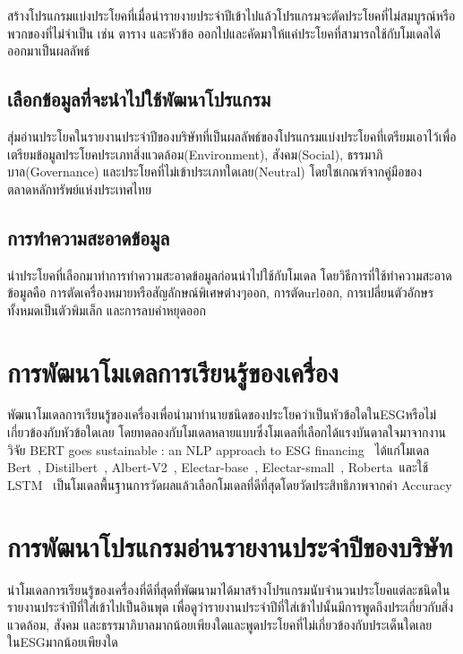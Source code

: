\enskip \enskip \enskip สร้างโปรแกรมแบ่งประโยคที่เมื่อนำรายงายประจำปีเข้าไปแล้วโปรแกรมจะตัดประโยคที่ไม่สมบูรณ์หรือพวกของที่ไม่จำเป็น 
เช่น ตาราง และหัวข้อ ออกไปและคัดมาให้แค่ประโยคที่สามารถใช้กับโมเดลได้ออกมาเป็นผลลัพธ์


\subsection{เลือกข้อมูลที่จะนำไปใช้พัฒนาโปรแกรม}

\enskip \enskip \enskip สุ่มอ่านประโยคในรายงานประจำปีของบริษัทที่เป็นผลลัพธ์ของโปรแกรมแบ่งประโยคที่เตรียมเอาไว้เพื่อเตรียมข้อมูลประโยคประเภทสิ่งแวดล้อม(Environment), 
สังคม(Social), ธรรมาภิบาล(Governance) และประโยคที่ไม่เข้าประเภทใดเลย(Neutral) โดยใชเกณฑ์จากคู่มือของตลาดหลักทรัพย์แห่งประเทศไทย ~\cite{sus}
  

\subsection{การทำความสะอาดข้อมูล}

\enskip \enskip \enskip นำประโยคที่เลือกมาทำการทำความสะอาดข้อมูลก่อนนำไปใช้กับโมเดล 
โดยวิธีการที่ใช้ทำความสะอาดข้อมูลคือ การตัดเครื่องหมายหรือสัญลักษณ์พิเศษต่างๆออก, การตัดurlออก, การเปลี่ยนตัวอักษรทั้งหมดเป็นตัวพิมเล็ก และการลบคำหยุดออก


\section{การพัฒนาโมเดลการเรียนรู้ของเครื่อง}

\enskip \enskip \enskip พัฒนาโมเดลการเรียนรู้ของเครื่องเพื่อนำมาทำนายชนิดของประโยคว่าเป็นหัวข้อใดในESGหรือไม่เกี่ยวข้องกับหัวข้อใดเลย 
โดยทดลองกับโมเดลหลายแบบซึ่งโมเดลที่เลือกได้แรงบันดาลใจมาจากงานวิจัย BERT goes sustainable : an NLP approach to ESG financing~\cite{torroni2021bert} ได้แก่โมเดล Bert~\cite{devlin2018bert}, Distilbert~\cite{sanh2019distilbert}, Albert-V2~\cite{lan2019albert}, Electar-base~\cite{clark2020electra}, Electar-small~\cite{clark2020electra}, Roberta~\cite{liu2019roberta}และใช้ LSTM~\cite{staudemeyer2019understanding} เป็นโมเดลพื้นฐานการวัดผลแล้วเลือกโมเดลที่ดีที่สุดโดยวัดประสิทธิภาพจากค่า Accuracy


\section{การพัฒนาโปรแกรมอ่านรายงานประจำปีของบริษัท}

\enskip \enskip \enskip นำโมเดลการเรียนรู้ของเครื่องที่ดีที่สุดที่พัฒนามาได้มาสร้างโปรแกรมนับจำนวนประโยคแต่ละชนิดในรายงานประจำปีที่ใส่เข้าไปเป็นอินพุต
เพื่อดูว่ารายงานประจำปีที่ใส่เข้าไปนั้นมีการพูดถึงประเกี่ยวกับสิ่งแวดล้อม, 
สังคม และธรรมาภิบาลมากน้อยเพียงใดและพูดประโยคที่ไม่เกี่ยวข้องกับประเด็นใดเลยในESGมากน้อยเพียงใด



